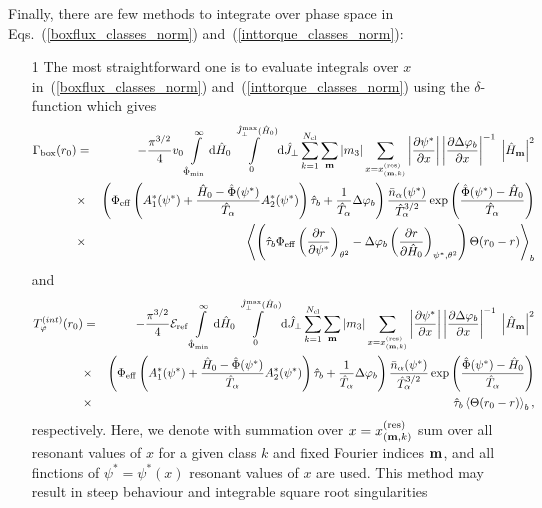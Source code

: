 \documentclass[preprint,prb,aps]{revtex4-1}
\newcommand{\bea}[1]{\begin{eqnarray} \label{#1}}
\newcommand{\eea}{\end{eqnarray}}
\newcommand{\eq}[1]{(\ref{#1})}
\newcommand{\difp}[2]{\frac{\partial #1}{\partial #2}}
\renewcommand{\bm}{{\bf m}}
\newcommand{\rd}{{\rm d}}
\begin{document}
Finally, there are few methods to integrate over phase space
in Eqs.~\eq{boxflux_classes_norm} and~\eq{inttorque_classes_norm}:
\begin{itemize}
\item[1]
The most straightforward one is to evaluate integrals over 
$x$ in~\eq{boxflux_classes_norm} and~\eq{inttorque_classes_norm}
using the $\delta$-function which gives
\bea{boxflux_classes_norm_evald}
\Gamma_{\rm box}(r_0) &=&
-\frac{\pi^{3/2}}{4} v_0
\int\limits_{\hat\Phi_{\rm min}}^\infty \rd \hat H_0
\int\limits_0^{\hat J_\perp^{\rm max}(\hat H_0)} \rd \hat J_\perp
\sum\limits_{k=1}^{N_{\rm cl}}
\sum_\bm |m_3|
\sum_{x=x^{(\rm res)}_{(\bm,k)}}
\left|\difp{\psi^\ast}{x}\right|
\left|\difp{\Delta \varphi_b}{x}\right|^{-1}
\;\left|\hat H_{\bm}\right|^2
\nonumber \\
&\times&
\left(
\Phi_{\rm eff}
\left(
A^\ast_1(\psi^\ast)+
\frac{\hat H_0-\hat \Phi(\psi^\ast)}{\hat T_\alpha}
A^\ast_2(\psi^\ast)
\right)
\hat \tau_b
+\frac{1}{\hat T_\alpha}\Delta\varphi_b
\right)
\frac{\bar n_\alpha(\psi^\ast)}{\hat T_\alpha^{3/2}}
\exp\left(\frac{\hat \Phi(\psi^\ast)-\hat H_0}{\hat T_\alpha}\right)
\nonumber \\
&\times&
\left\langle
\left(
\hat\tau_b \Phi_{\rm eff}
\left(\difp{r}{\psi^\ast}\right)_{\theta^2}
-\Delta\varphi_b\left(\difp{r}{\hat H_0}\right)_{\psi^\ast,\theta^2}
\right)\Theta(r_0-r)
\right\rangle_b
\eea
and
\bea{inttorque_classes_norm_evald}
T_\varphi^{(int)}(r_0)
&=&
-\frac{\pi^{3/2}}{4} {\cal E}_{\rm ref}
\int\limits_{\hat\Phi_{\rm min}}^\infty \rd \hat H_0
\int\limits_0^{\hat J_\perp^{\rm max}(\hat H_0)} \rd \hat J_\perp
\sum\limits_{k=1}^{N_{\rm cl}}
\sum_\bm |m_3|
\sum_{x=x^{(\rm res)}_{(\bm,k)}}
\left|\difp{\psi^\ast}{x}\right|
\left|\difp{\Delta \varphi_b}{x}\right|^{-1}
\;\left|\hat H_{\bm}\right|^2
\nonumber \\
&\times&
\left(
\Phi_{\rm eff}
\left(
A^\ast_1(\psi^\ast)+
\frac{\hat H_0-\hat \Phi(\psi^\ast)}{\hat T_\alpha}
A^\ast_2(\psi^\ast)
\right)
\hat \tau_b
+\frac{1}{\hat T_\alpha}\Delta\varphi_b
\right)
\frac{\bar n_\alpha(\psi^\ast)}{\hat T_\alpha^{3/2}}
\exp\left(\frac{\hat \Phi(\psi^\ast)-\hat H_0}{\hat T_\alpha}\right)
\nonumber \\
&\times&
\hat\tau_b 
\left\langle
\Theta(r_0-r)
\right\rangle_b,
\eea
respectively.
Here, we denote with summation over $x=x^{(\rm res)}_{(\bm,k)}$ sum over
all resonant values of $x$ for a given class $k$ and fixed Fourier indices $\bm$,
and all finctions of $\psi^\ast=\psi^\ast(x)$ resonant values of $x$ are used.
This method may result in steep behaviour and integrable square root singularities 

\end{itemize}
\end{document}
